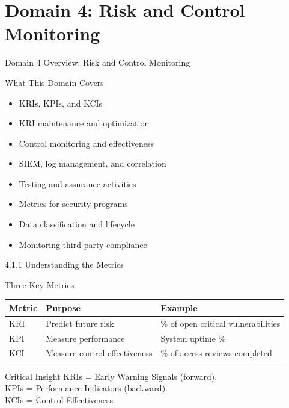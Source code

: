 \documentclass{beamer}
\begin{document}
	\section{Domain 4: Risk and Control Monitoring}
	
	\begin{frame}{Domain 4 Overview: Risk and Control Monitoring}
		\begin{block}{What This Domain Covers}
			\begin{itemize}
				\item KRIs, KPIs, and KCIs
				\item KRI maintenance and optimization
				\item Control monitoring and effectiveness
				\item SIEM, log management, and correlation
				\item Testing and assurance activities
				\item Metrics for security programs
				\item Data classification and lifecycle
				\item Monitoring third-party compliance
			\end{itemize}
		\end{block}
	\end{frame}
	
	\begin{frame}{4.1.1 Understanding the Metrics}
		\begin{block}{Three Key Metrics}
			\begin{tabular}{|p{2.5cm}|p{4cm}|p{4.5cm}|}
				\hline
				\textbf{Metric} & \textbf{Purpose} & \textbf{Example} \\
				\hline
				KRI & Predict future risk & \% of open critical vulnerabilities \\
				\hline
				KPI & Measure performance & System uptime \% \\
				\hline
				KCI & Measure control effectiveness & \% of access reviews completed \\
				\hline
			\end{tabular}
		\end{block}
		\begin{alertblock}{Critical Insight}
			KRIs = Early Warning Signals (forward). \\
			KPIs = Performance Indicators (backward). \\
			KCIs = Control Effectiveness.
		\end{alertblock}
	\end{frame}
	
\end{document}
